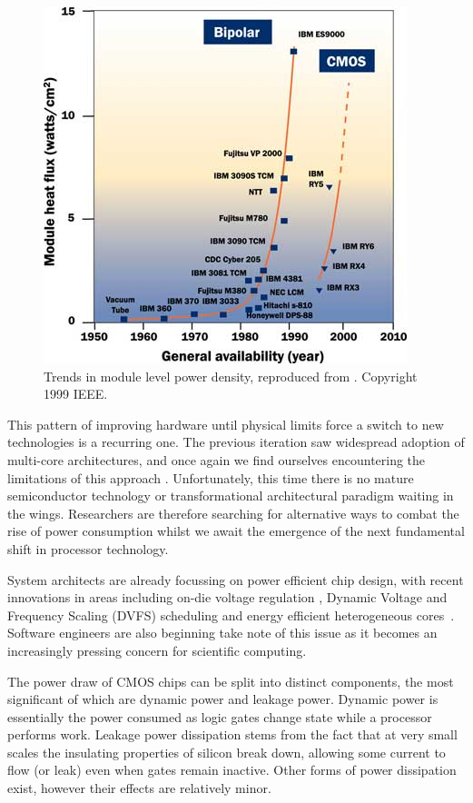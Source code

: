 \begin{figure}[ht]
\centering
\includegraphics[width=0.9\linewidth]{Images/bipolarcmos.jpg}
\caption{Trends in module level power density, reproduced from \cite{chu:1999aa}. Copyright 1999 IEEE.}
\end{figure}
This pattern of improving hardware until physical limits force a switch to new technologies is a recurring one. The previous iteration saw widespread adoption of multi-core architectures, and once again we find ourselves encountering the limitations of this approach \cite{esmaeilzadeh:2011aa}. Unfortunately,  this time there is no mature semiconductor technology or transformational architectural paradigm waiting in the wings. Researchers are therefore searching for alternative ways to combat the rise of power consumption whilst we await the emergence of the next fundamental shift in processor technology. \golden

System architects are already focussing on power efficient chip design, with recent innovations in areas including on-die voltage regulation \cite{burton:2014aa}, Dynamic Voltage and Frequency Scaling (DVFS) scheduling \cite{kwon:2013aa} and energy efficient heterogeneous cores~\cite{gupta:2012aa}. Software engineers are also beginning take note of this issue as it becomes an increasingly pressing concern for scientific computing. \golden

The power draw of CMOS chips can be split into distinct components, the most significant of which are dynamic power and leakage power. Dynamic power is essentially the power consumed as logic gates change state while a processor performs work. Leakage power dissipation stems from the fact that at very small scales the insulating properties of silicon break down, allowing some current to flow (or leak) even when gates remain inactive. Other forms of power dissipation exist, however their effects are relatively minor. \golden

